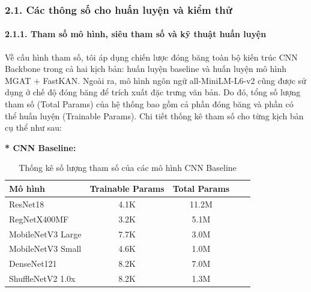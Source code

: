\subsubsection{2.1. Các thông số cho huấn luyện và kiểm thử}

\paragraph{2.1.1. Tham số mô hình, siêu tham số và kỹ thuật huấn luyện}
\indent\indent Về cấu hình tham số, tôi áp dụng chiến lược đóng băng toàn bộ kiến trúc CNN Backbone trong cả hai kịch bản: huấn luyện baseline và huấn luyện mô hình MGAT + FastKAN. Ngoài ra, mô hình ngôn ngữ all-MiniLM-L6-v2 cũng được sử dụng ở chế độ đóng băng để trích xuất đặc trưng văn bản. Do đó, tổng số lượng tham số (Total Params) của hệ thống bao gồm cả phần đóng băng và phần có thể huấn luyện (Trainable Params). Chi tiết thống kê tham số cho từng kịch bản cụ thể như sau:

\vspace{0.3cm}
\textbf{* CNN Baseline:}
\begin{table}[H]
    \centering
    \caption{Thống kê số lượng tham số của các mô hình CNN Baseline}
    \label{tab:CNNBaselineParams}
    \renewcommand{\arraystretch}{1.15}
    \begin{tabular}{lcccc}
        \hline
        \textbf{Mô hình} & \textbf{Trainable Params} & \textbf{Total Params} \\
        \hline
        ResNet18              & 4.1K & 11.2M \\
        RegNetX400MF          & 3.2K & 5.1M \\
        MobileNetV3 Large     & 7.7K & 3.0M \\
        MobileNetV3 Small     & 4.6K & 1.0M \\
        DenseNet121           & 8.2K & 7.0M \\
        ShuffleNetV2 1.0x     & 8.2K & 1.3M \\
        \hline
    \end{tabular}
\end{table}

